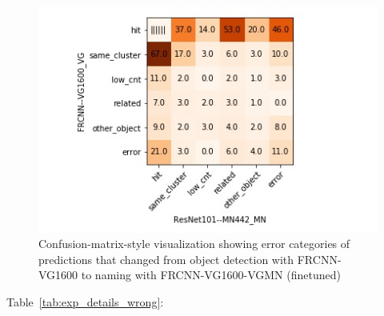 \begin{figure}[t]
\includegraphics[scale=.5]{images/matrix_FRCNN--VG1600_VG_ResNet101--MN442_MN.jpg}

\caption{Confusion-matrix-style visualization showing error categories of predictions that changed from object detection with FRCNN-VG1600 to naming with FRCNN-VG1600-VGMN (finetuned)}
\end{figure}



Table\ \ref{tab:exp_details_wrong}: 

